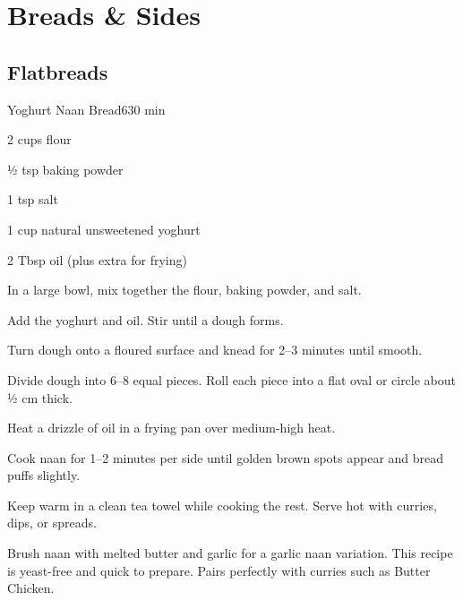 \chapter{Breads \& Sides}
\minitoc

\section*{Flatbreads}

\begin{recipebox}{Yoghurt Naan Bread}{6}{30 min}
\begin{ingredients}
  \item 2 cups flour
  \item ½ tsp baking powder
  \item 1 tsp salt
  \item 1 cup natural unsweetened yoghurt
  \item 2 Tbsp oil (plus extra for frying)
\end{ingredients}

\begin{method}
  \item In a large bowl, mix together the flour, baking powder, and salt.  
  \item Add the yoghurt and oil. Stir until a dough forms.  
  \item Turn dough onto a floured surface and knead for 2–3 minutes until smooth.  
  \item Divide dough into 6–8 equal pieces. Roll each piece into a flat oval or circle about ½ cm thick.  
  \item Heat a drizzle of oil in a frying pan over medium-high heat.  
  \item Cook naan for 1–2 minutes per side until golden brown spots appear and bread puffs slightly.  
  \item Keep warm in a clean tea towel while cooking the rest. Serve hot with curries, dips, or spreads.  
\end{method}

\begin{notes}
Brush naan with melted butter and garlic for a garlic naan variation.  
This recipe is yeast-free and quick to prepare.  
Pairs perfectly with curries such as Butter Chicken.  
\end{notes}
\end{recipebox}


